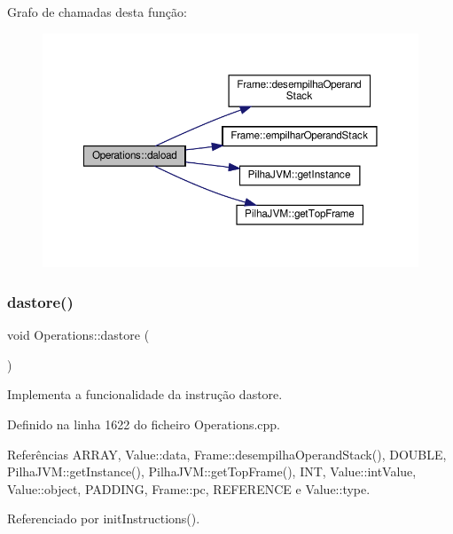 Grafo de chamadas desta função\+:
\nopagebreak
\begin{figure}[H]
\begin{center}
\leavevmode
\includegraphics[width=350pt]{classOperations_a63691de547749780c372e285bd6a97bc_cgraph}
\end{center}
\end{figure}
\mbox{\label{classOperations_a9735fdb8ba4ea2d7b8b32e8d0a5d2f72}} 
\subsubsection{\texorpdfstring{dastore()}{dastore()}}
{\footnotesize\ttfamily void Operations\+::dastore (\begin{DoxyParamCaption}{ }\end{DoxyParamCaption})\hspace{0.3cm}{\ttfamily [private]}}



Implementa a funcionalidade da instrução dastore. 



Definido na linha 1622 do ficheiro Operations.\+cpp.



Referências A\+R\+R\+AY, Value\+::data, Frame\+::desempilha\+Operand\+Stack(), D\+O\+U\+B\+LE, Pilha\+J\+V\+M\+::get\+Instance(), Pilha\+J\+V\+M\+::get\+Top\+Frame(), I\+NT, Value\+::int\+Value, Value\+::object, P\+A\+D\+D\+I\+NG, Frame\+::pc, R\+E\+F\+E\+R\+E\+N\+CE e Value\+::type.



Referenciado por init\+Instructions().

